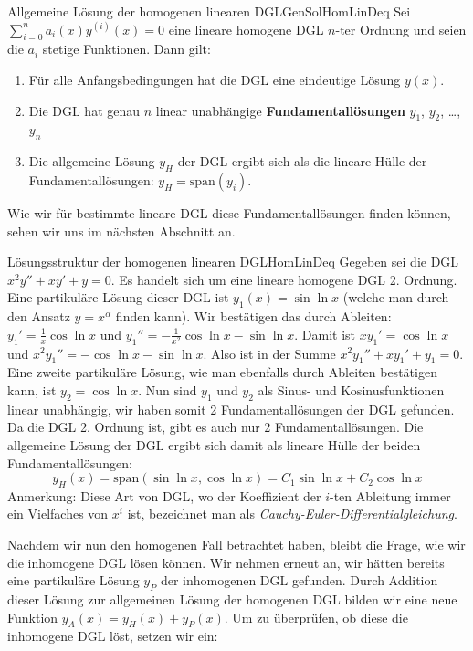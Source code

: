 \begin{statement}{Allgemeine Lösung der homogenen linearen DGL}{GenSolHomLinDeq}
    Sei $\sum\limits_{i=0}^n a_i(x) y^{(i)}(x) = 0$ eine lineare homogene DGL $n$-ter Ordnung und seien die $a_i$ stetige Funktionen. Dann gilt:
    \begin{enumerate}
        \item Für alle Anfangsbedingungen hat die DGL eine eindeutige Lösung $y(x)$.
        \item Die DGL hat genau $n$ linear unabhängige \textbf{Fundamentallösungen} $y_1$, $y_2$, \dots, $y_n$
        \item Die allgemeine Lösung $y_H$ der DGL ergibt sich als die lineare Hülle der Fundamentallösungen: $y_H = \text{span}(y_i)$.
    \end{enumerate}
\end{statement}

Wie wir für bestimmte lineare DGL diese Fundamentallösungen finden können, sehen wir uns im nächsten Abschnitt an.

\begin{example}{Lösungsstruktur der homogenen linearen DGL}{HomLinDeq}
    Gegeben sei die DGL $x^2y''+xy'+y=0$. Es handelt sich um eine lineare homogene DGL 2. Ordnung. Eine partikuläre Lösung dieser DGL ist $y_1(x) = \sin\ln x$ (welche man durch den Ansatz $y=x^\alpha$ finden kann). Wir bestätigen das durch Ableiten: $y_1' = \frac{1}{x}\cos\ln x$ und $y_1''= -\frac{1}{x^2} \cos\ln x -\sin\ln x$. Damit ist $xy_1'=\cos\ln x$ und $x^2y_1'' = -\cos\ln x-\sin\ln x$. Also ist in der Summe $x^2y_1''+xy_1'+y_1 = 0$. Eine zweite partikuläre Lösung, wie man ebenfalls durch Ableiten bestätigen kann, ist $y_2 = \cos\ln x$.  Nun sind $y_1$ und $y_2$ als Sinus- und Kosinusfunktionen linear unabhängig, wir haben somit 2 Fundamentallösungen der DGL gefunden. Da die DGL 2. Ordnung ist, gibt es auch nur 2 Fundamentallösungen. Die allgemeine Lösung der DGL ergibt sich damit als lineare Hülle der beiden Fundamentallösungen:
    $$
        y_H(x) = \text{span}(\sin\ln x, \cos\ln x) = C_1 \sin\ln x + C_2 \cos\ln x
    $$
    Anmerkung: Diese Art von DGL, wo der Koeffizient der $i$-ten Ableitung immer ein Vielfaches von $x^i$ ist, bezeichnet man als \emph{Cauchy-Euler-Differentialgleichung}.
\end{example}

Nachdem wir nun den homogenen Fall betrachtet haben, bleibt die Frage, wie wir die inhomogene DGL lösen können. Wir nehmen erneut an, wir hätten bereits eine partikuläre Lösung $y_P$ der inhomogenen DGL gefunden. Durch Addition dieser Lösung zur allgemeinen Lösung der homogenen DGL bilden wir eine neue Funktion $y_A(x) = y_H(x) + y_P(x)$. Um zu überprüfen, ob diese die inhomogene DGL löst, setzen wir ein:

